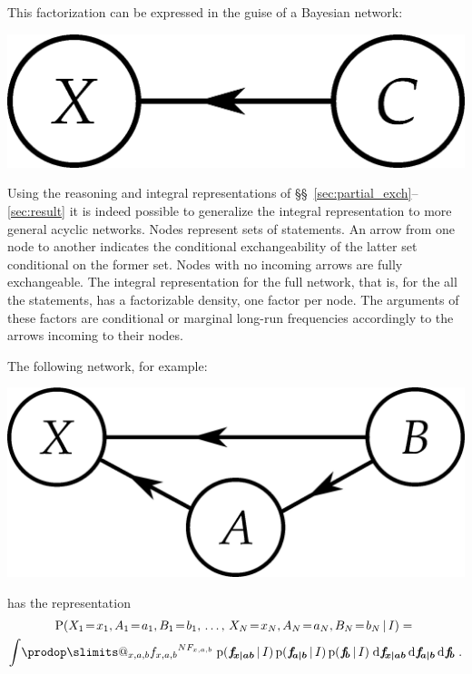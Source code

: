 \documentclass[\ifafour a4paper,12pt,\else a5paper,10pt,\fi%
onecolumn,oneside,article,%
british%
]{memoir}
\makeatletter
\theoremstyle{remark}
\theoremstyle{innote}
\def\prod{\DOTSI\prodop\slimits@}
\newcommand*{\di}{\mathrm{d}}%
\newcommand*{\pf}{\mathrm{p}}%
\newcommand*{\p}{\mathrm{P}}%
\renewcommand*{\|}[1][]{\nonscript\,#1\vert\nonscript\,\mathopen{}}
\newcommand*{\sects}{\S\S}%
\renewcommand*{\=}{\TextOrMath\texteq\eq}
\newcommand*{\X}[1]{X_{#1}}
\newcommand*{\x}[1]{x_{#1}}
\newcommand*{\A}[1]{A_{#1}}
\newcommand*{\va}[1]{a_{#1}}
\newcommand*{\B}[1]{B_{#1}}
\newcommand*{\vb}[1]{b_{#1}}
\newcommand*{\ff}[1]{f_{#1}}
\newcommand*{\ffb}[1]{\bm{f_{\!#1}}}
\newcommand*{\FF}[1]{F_{#1}}
\newcommand*{\bcond}[1][]{\nonscript\,#1\bm{\vert}\nonscript\;\mathopen{}}
\makeatother
\begin{document}
This factorization can be expressed in the guise of a Bayesian network:
\begin{center}%
\includegraphics[scale=0.5]{bayesnet1.png}
\end{center}%

Using the reasoning and integral representations of
\sects~\ref{sec:partial_exch}--\ref{sec:result} it is indeed possible to
generalize the integral representation to more general acyclic networks.
Nodes represent sets of statements. An arrow from one node to another
indicates the conditional exchangeability of the latter set conditional on
the former set. Nodes with no incoming arrows are fully exchangeable. The
integral representation for the full network, that is, for the all the
statements, has a factorizable density, one factor per node. The arguments
of these factors are conditional or marginal long-run frequencies
accordingly to the arrows incoming to their nodes.

The following network, for example:
\begin{center}%
\includegraphics[scale=0.5]{bayesnet3.png}
\end{center}%
has the representation
\begin{multline}
  \label{eq:example1}
  \p( \X{1}\=\x{1}, \A{1}\=\va{1}, \B{1}\=\vb{1},\, \dotsc,\,
   \X{N}\=\x{N}, \A{N}\=\va{N}, \B{N}\=\vb{N} \| I) ={}\\
\int\!\prod_{x,a,b} {\ff{x,a,b}}^{N \FF{x,a,b}}\;
\pf(\ffb{x \bcond ab}\|I)\,\pf(\ffb{a \bcond b}\|I)\,\pf(\ffb{b}\|I)
\;\di\ffb{x \bcond ab} \,\di\ffb{a \bcond b} \,\di\ffb{b} \;.
\end{multline}
\end{document}
